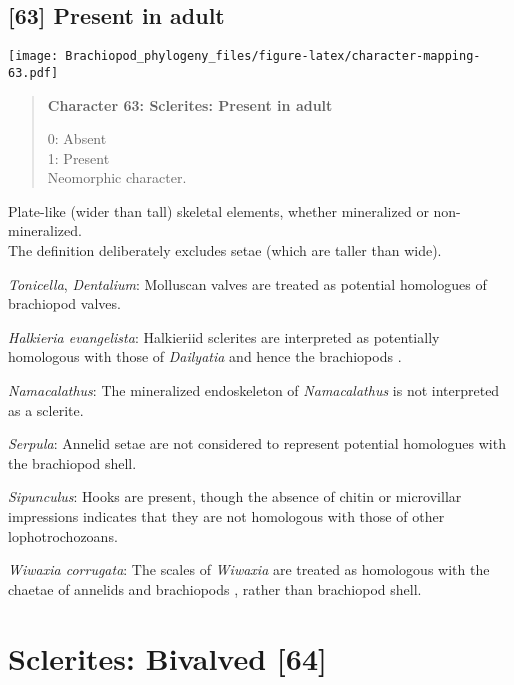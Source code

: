 \documentclass[openany]{book}
\theoremstyle{definition}
\theoremstyle{definition}
\theoremstyle{definition}
\theoremstyle{remark}
\begin{document}
\subsection*{{[}63{]} Present in adult}\label{present-in-adult}

\texttt{[image: Brachiopod\_phylogeny\_files/figure-latex/character-mapping-63.pdf]}

\begin{quote}
\textbf{Character 63: Sclerites: Present in adult}

0: Absent\\
1: Present\\
Neomorphic character.
\end{quote}

Plate-like (wider than tall) skeletal elements, whether mineralized or
non-mineralized.\\
The definition deliberately excludes setae (which are taller than wide).

\hypertarget{Dentalium-coding-63}{}
\emph{Tonicella}, \emph{Dentalium}: Molluscan valves are treated as
potential homologues of brachiopod valves.

\hypertarget{Halkieria_evangelista-coding-63}{}
\emph{Halkieria evangelista}: Halkieriid sclerites are interpreted as
potentially homologous with those of \emph{Dailyatia} and hence the
brachiopods \citep{Zhao2017}.

\hypertarget{Namacalathus-coding-63}{}
\emph{Namacalathus}: The mineralized endoskeleton of \emph{Namacalathus}
is not interpreted as a sclerite.

\hypertarget{Serpula-coding-63}{}
\emph{Serpula}: Annelid setae are not considered to represent potential
homologues with the brachiopod shell.

\hypertarget{Sipunculus-coding-63}{}
\emph{Sipunculus}: Hooks are present, though the absence of chitin or
microvillar impressions indicates that they are not homologous with
those of other lophotrochozoans.

\hypertarget{Wiwaxia_corrugata-coding-63}{}
\emph{Wiwaxia corrugata}: The scales of \emph{Wiwaxia} are treated as
homologous with the chaetae of annelids and brachiopods
\citep{Butterfield1990, Smith2014, Zhang2015}, rather than brachiopod
shell.

\section{Sclerites: Bivalved {[}64{]}}\label{sclerites-bivalved-64}
\end{document}
